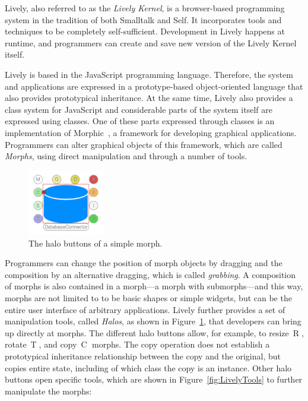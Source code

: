 Lively, also referred to as the \emph{Lively Kernel}, is a browser-based programming system in the tradition of both Smalltalk and Self.
It incorporates tools and techniques to be completely self-sufficient.
Development in Lively happens at runtime, and programmers can create and save new version of the Lively Kernel itself.

Lively is based in the JavaScript programming language.
Therefore, the system and applications are expressed in a prototype-based object-oriented language that also provides prototypical inheritance.
At the same time, Lively also provides a class system for JavaScript and considerable parts of the system itself are expressed using classes.
One of these parts expressed through classes is an implementation of Morphic~\cite{Maloney1995Mor}, a framework for developing graphical applications.
Programmers can alter graphical objects of this framework, which are called \emph{Morphs}, using direct manipulation and through a number of tools.

\begin{figure}[h]
    \centering
    \includegraphics[width=0.3\textwidth]{figures/halos.pdf}
    \caption{The halo buttons of a simple morph.}
    \label{fig:Halos}
\end{figure}

Programmers can change the position of morph objects by dragging and the composition by an alternative dragging, which is called \emph{grabbing}.
A composition of morphs is also contained in a morph---a morph with submorphs---and this way, morphs are not limited to to be basic shapes or simple widgets, but can be the entire user interface of arbitrary applications.
Lively further provides a set of manipulation tools, called \emph{Halos}, as shown in Figure~\ref{fig:Halos}, that developers can bring up directly at morphs.
The different halo buttons allow, for example, to resize~\textcircled{R}, rotate~\textcircled{T}, and copy~\textcircled{C} morphs.
The copy operation does not establish a prototypical inheritance relationship between the copy and the original, but copies entire state, including of which class the copy is an instance.
Other halo buttons open specific tools, which are shown in Figure~\ref{fig:LivelyTools} to further manipulate the morphs:

